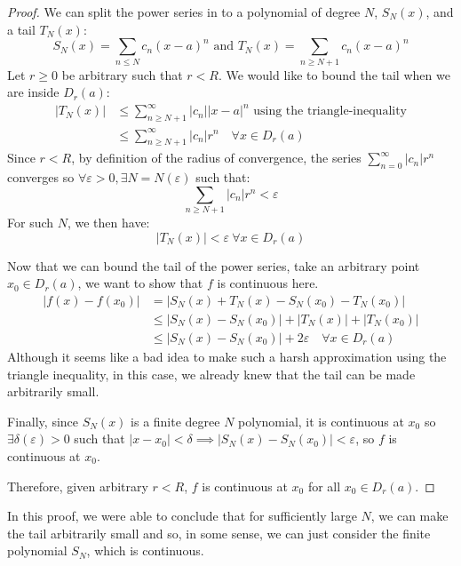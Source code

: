 \documentclass[../main.tex]{subfiles}
\begin{document}
\begin{proof}
  \nonexaminable
  We can split the power series in to a polynomial of degree $N$, $S_N(x)$, and a tail $T_N(x)$:
  \[
    S_N(x) = \sum_{n \leq N} c_n(x - a)^{n} \text{ and } T_N(x) = \sum_{n \geq N + 1} c_n(x - a)^{n}
  \]
  Let $r \geq 0$ be arbitrary such that $r < R$.
  We would like to bound the tail when we are inside $D_r(a)$:
  \begin{align*}
    |T_N(x)| &\leq \sum_{n \geq N + 1}^{\infty} |c_n||x - a|^{n} \text{ using the triangle-inequality} \\
             &\leq \sum_{n \geq N + 1}^{\infty} |c_n|r^{n} \quad \forall x \in D_r(a)
  \end{align*}
  Since $r < R$, by definition of the radius of convergence, the series $\sum_{n = 0}^{\infty} |c_n|r^{n}$ converges so $\forall \varepsilon > 0, \exists N = N(\varepsilon)$ such that:
  \[
    \sum_{n \geq N + 1}|c_n|r^{n} < \varepsilon
  \]
  For such $N$, we then have:
  \[
     |T_N(x)| < \varepsilon\ \forall x \in D_r(a)
  \]

  Now that we can bound the tail of the power series, take an arbitrary point $x_0 \in D_r(a)$, we want to show that $f$ is continuous here.
  \begin{align*}
    |f(x) - f(x_0)| &= |S_N(x) + T_N(x) - S_N(x_0) - T_N(x_0)| \\
                    &\leq |S_N(x) - S_N(x_0)| + |T_N(x)| + |T_N(x_0)| \\
                    &\leq |S_N(x) - S_N(x_0)| + 2\varepsilon \quad \forall x \in D_r(a)
  \end{align*}
  Although it seems like a bad idea to make such a harsh approximation using the triangle inequality, in this case, we already knew that the tail can be made arbitrarily small.

  Finally, since $S_N(x)$ is a finite degree $N$ polynomial, it is continuous at $x_0$ so $\exists \delta(\varepsilon) > 0$ such that $|x - x_0| < \delta \implies |S_N(x) - S_N(x_0)| < \varepsilon$, so $f$ is continuous at $x_0$.

  Therefore, given arbitrary $r < R$, $f$ is continuous at $x_0$ for all $x_0 \in D_r(a)$.
\end{proof}
\begin{remark}[Strategy]
  In this proof, we were able to conclude that for sufficiently large $N$, we can make the tail arbitrarily small and so, in some sense, we can just consider the finite polynomial $S_N$, which is continuous.
\end{remark}
\end{document}

